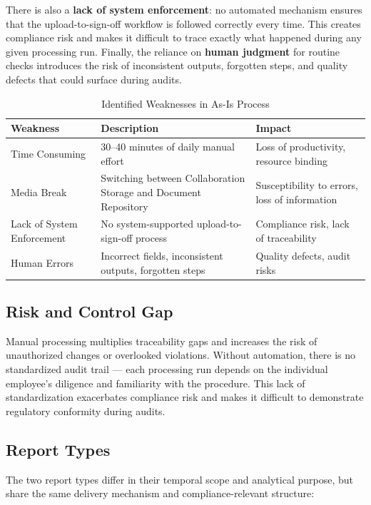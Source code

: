 \documentclass[11pt,a4paper]{article}
\begin{document}
There is also a \textbf{lack of system enforcement}: no automated mechanism ensures that the upload-to-sign-off workflow is followed correctly every time. This creates compliance risk and makes it difficult to trace exactly what happened during any given processing run. Finally, the reliance on \textbf{human judgment} for routine checks introduces the risk of inconsistent outputs, forgotten steps, and quality defects that could surface during audits.

\begin{table}[ht]
\centering
\caption{Identified Weaknesses in As-Is Process}
\begin{tabular}{@{}p{}p{}p{}@{}}
\toprule
\textbf{Weakness} & \textbf{Description} & \textbf{Impact} \\
\midrule
Time Consuming & 30--40 minutes of daily manual effort & Loss of productivity, resource binding \\
Media Break & Switching between Collaboration Storage and Document Repository & Susceptibility to errors, loss of information \\
Lack of System Enforcement & No system-supported upload-to-sign-off process & Compliance risk, lack of traceability \\
Human Errors & Incorrect fields, inconsistent outputs, forgotten steps & Quality defects, audit risks \\
\bottomrule
\end{tabular}
\end{table}

\subsection{Risk and Control Gap}

Manual processing multiplies traceability gaps and increases the risk of unauthorized changes or overlooked violations. Without automation, there is no standardized audit trail --- each processing run depends on the individual employee's diligence and familiarity with the procedure. This lack of standardization exacerbates compliance risk and makes it difficult to demonstrate regulatory conformity during audits.

\subsection{Report Types}

The two report types differ in their temporal scope and analytical purpose, but share the same delivery mechanism and compliance-relevant structure:
\end{document}
